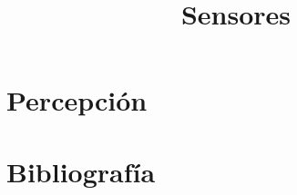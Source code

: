 \documentclass[aspectratio=169,compress]{beamer}
\title{Sensores}
\author{}
\institute{Universidad Nacional de Rosario}
\date{}
\begin{document}
\frame{\titlepage}

\section{Percepción}




























\section{Bibliografía}

\end{document}
